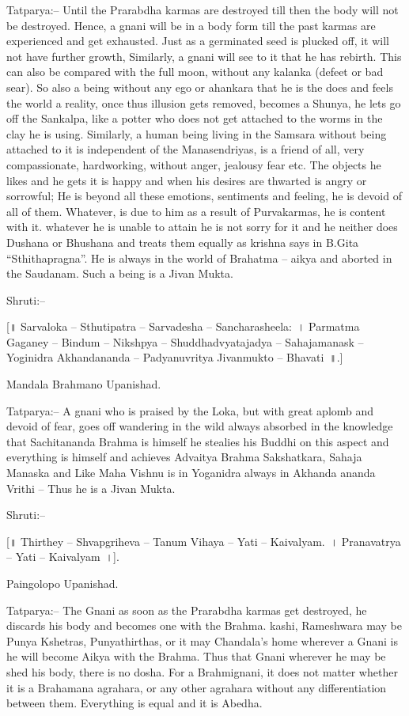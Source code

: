 Tatparya:– Until the Prarabdha karmas are destroyed till then the body will not be destroyed. Hence, a gnani will be in a body form till the past karmas are experienced and get exhausted. Just as a germinated seed is plucked off, it will not have further growth, Similarly, a gnani will see to it that he has rebirth. This can also be compared with the full moon, without any kalanka (defeet or bad sear). So also a being without any ego or ahankara that he is the does and feels the world a reality, once thus illusion gets removed, becomes a Shunya, he lets go off the Sankalpa, like a potter who does not get attached to the worms in the clay he is using. Similarly, a human being living in the Samsara without being attached to it is independent of the Manasendriyas, is a friend of all, very compassionate, hardworking, without anger, jealousy fear etc. The objects he likes and he gets it is happy and when his desires are thwarted is angry or sorrowful; He is beyond all these emotions, sentiments and feeling, he is devoid of all of them. Whatever, is due to him as a result of Purvakarmas, he is content with it. whatever he is unable to attain he is not sorry for it and he neither does Dushana or Bhushana and treats them equally as krishna says in B.Gita “Sthithapragna”. He is always in the world of Brahatma – aikya and aborted in the Saudanam. Such a being is a Jivan Mukta.

Shruti:–

[॥ Sarvaloka – Sthutipatra – Sarvadesha – Sancharasheela:~। Parmatma Gaganey – Bindum – Nikshpya – Shuddhadvyatajadya – Sahajamanask – Yoginidra Akhandananda – Padyanuvritya Jivanmukto – Bhavati~॥.]

Mandala Brahmano Upanishad.

Tatparya:– A gnani who is praised by the Loka, but with great aplomb and devoid of fear, goes off wandering in the wild always absorbed in the knowledge that Sachitananda Brahma is himself he stealies his Buddhi on this aspect and everything is himself and achieves Advaitya Brahma Sakshatkara, Sahaja Manaska and Like Maha Vishnu is in Yoganidra always in Akhanda ananda Vrithi – Thus he is a Jivan Mukta.

Shruti:–

[॥ Thirthey – Shvapgriheva – Tanum Vihaya – Yati – Kaivalyam.~। Pranavatrya – Yati – Kaivalyam~।].

Paingolopo Upanishad.

Tatparya:– The Gnani as soon as the Prarabdha karmas get destroyed, he discards his body and becomes one with the Brahma. kashi, Rameshwara may be Punya Kshetras, Punyathirthas, or it may Chandala's home wherever a Gnani is he will become Aikya with the Brahma. Thus that Gnani wherever he may be shed his body, there is no dosha. For a Brahmignani, it does not matter whether it is a Brahamana agrahara, or any other agrahara without any differentiation between them. Everything is equal and it is Abedha.


